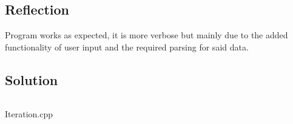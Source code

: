 \documentclass[main.tex]{subfiles}
\begin{document}
        \subsection{Reflection}
            Program works as expected, it is more verbose but mainly due to the added functionality
            of user input and the required parsing for said data.
        
        \subsection{Solution}
            \begin{listing}[H]
                \inputminted{cpp}{../Tasks/05-Iteration/Iteration.cpp}
                \caption{Iteration.cpp}
            \end{listing}
\end{document}
